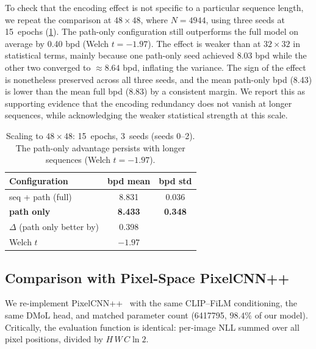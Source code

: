 \documentclass[conference]{IEEEtran}
\begin{document}
To check that the encoding effect is not specific to a particular
sequence length, we repeat the comparison at $48\times48$, where
$N=4944$, using three seeds at 15~epochs (\cref{tab:scale}).
The path-only configuration still outperforms the full model on
average by \SI{0.40}{} bpd (Welch $t=-1.97$). The effect is weaker
than at $32\times32$ in statistical terms, mainly because one
path-only seed achieved \SI{8.03}{} bpd while the other two
converged to $\approx 8.64$ bpd, inflating the variance. The sign
of the effect is nonetheless preserved across all three seeds, and
the mean path-only bpd (\num{8.43}) is lower than the mean full bpd
(\num{8.83}) by a consistent margin. We report this as supporting
evidence that the encoding redundancy does not vanish at longer
sequences, while acknowledging the weaker statistical strength at
this scale.

\begin{table}[t]
\centering
\caption{Scaling to $48\times48$: 15~epochs, 3~seeds (seeds 0--2).
The path-only advantage persists with longer sequences
(Welch $t=-1.97$).}
\label{tab:scale}
\begin{tabular}{lcc}
\toprule
Configuration & bpd mean & bpd std \\
\midrule
seq + path (full)        & 8.831 & 0.036 \\
\textbf{path only}       & \bfseries 8.433 & \bfseries 0.348 \\
\midrule
$\Delta$ (path only better by) & 0.398 & \\
Welch $t$                & $-1.97$ & \\
\bottomrule
\end{tabular}
\end{table}

\subsection{Comparison with Pixel-Space PixelCNN++}\label{ssec:pixelcnn}

We re-implement PixelCNN++~\cite{salimans2017pixelcnnpp} with the
same CLIP--FiLM conditioning, the same DMoL head, and matched
parameter count (\num{6417795}, $98.4\%$ of our model). Critically,
the evaluation function is identical: per-image NLL summed over all
pixel positions, divided by $H\,W\,C \ln 2$.
\end{document}
